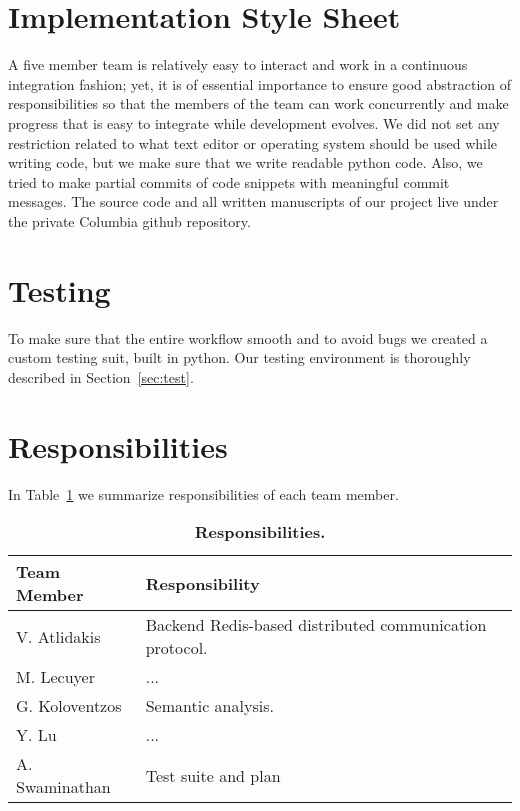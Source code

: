 \section{Implementation Style Sheet}
A five member team is relatively easy to interact and work in a continuous
integration fashion; yet, it is of essential importance to ensure good
abstraction of responsibilities so that the members of the team can work
concurrently and make progress that is easy to integrate while development
evolves. We did not set any restriction related to what text editor or
operating system  should be used while writing code, but we make sure that
we write readable python code. Also, we tried to make partial commits of
code snippets with meaningful commit messages. The source code and all written
manuscripts of our project live under the private Columbia github repository.

\section{Testing}
To make sure that the entire workflow smooth and to avoid bugs we created a
custom testing suit, built in python. Our testing environment is thoroughly
described in Section~\ref{sec:test}.

\section{Responsibilities}
In Table~\ref{tab:resp} we summarize responsibilities of each team member.
\begin{table}[!h]
{%
 \begin{center}
    \begin{tabular}{ | l || l |}
    \hline
    \textbf{Team Member} & \textbf{Responsibility} \\
    \hline
    \hline
    V. Atlidakis & Backend Redis-based distributed communication protocol.\\ \hline
    M. Lecuyer & ... \\ \hline
    G. Koloventzos & Semantic analysis. \\ \hline
    Y. Lu & ...  \\ \hline
    A. Swaminathan  & Test suite and plan \\ \hline
    \hline
    \end{tabular}
    \caption{\textbf{Responsibilities.}}
    \label{tab:resp}
 \end{center}
}
\end{table}

